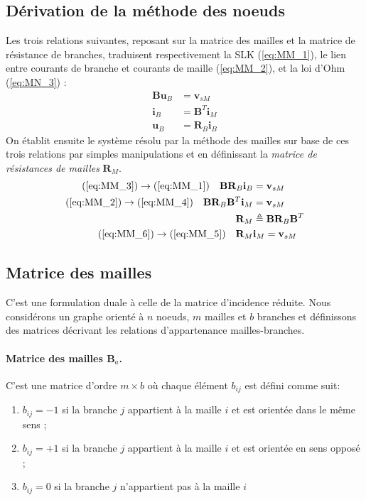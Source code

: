 \subsection{Dérivation de la méthode des noeuds}

Les trois relations suivantes, reposant sur la matrice des mailles et la matrice de résistance de branches, traduisent respectivement la SLK (\ref{eq:MM_1}), le lien entre courants de branche et courants de maille (\ref{eq:MM_2}), et la loi d'Ohm (\ref{eq:MN_3}) :
\begin{align}
\mathbf{B} \mathbf{u}_B &= \mathbf{v}_{sM} \label{eq:MM_1}\\
\mathbf{i}_B &= \mathbf{B}^T \mathbf{i}_{M} \label{eq:MM_2}\\
\mathbf{u}_B &= \mathbf{R}_B \mathbf{i}_{B} \label{eq:MM_3}
\end{align}
On établit ensuite le système résolu par la méthode des mailles sur base de ces trois relations par simples manipulations et en définissant la \textit{matrice de résistances de mailles} $\mathbf{R}_M.$
\begin{align}
(\ref{eq:MM_3}) \rightarrow (\ref{eq:MM_1}) \quad \mathbf{B} \mathbf{R}_B \mathbf{i}_{B} &= \mathbf{v}_{sM} \label{eq:MM_4}\\
(\ref{eq:MM_2}) \rightarrow (\ref{eq:MM_4}) \quad \mathbf{B} \mathbf{R}_B \mathbf{B}^T \mathbf{i}_{M} &= \mathbf{v}_{sM} \label{eq:MM_5}\\
\mathbf{R}_M &\triangleq \mathbf{B} \mathbf{R}_B \mathbf{B}^T \label{eq:MM_6}\\
(\ref{eq:MM_6}) \rightarrow (\ref{eq:MM_5}) \quad \mathbf{R}_M &\mathbf{i}_M = \mathbf{v}_{sM}
\end{align}

\subsection{Matrice des mailles}
C'est une formulation duale à celle de la matrice d'incidence réduite.
Nous considérons un graphe orienté à $n$ noeuds, $m$ mailles et $b$ branches et définissons des matrices décrivant les relations d'appartenance mailles-branches.

\paragraph{Matrice des mailles $\mathbf{B}_a$.} C'est une matrice d'ordre $m \times b$ où chaque élément $b_{ij}$ est défini comme suit:
\begin{enumerate}
	\item $b_{ij} = -1$ si la branche $j$ appartient à la maille $i$ et est orientée dans le même sens ;
	\item $b_{ij} = +1$ si la branche $j$ appartient à la maille $i$ et est orientée en sens opposé ;
	\item $b_{ij} = 0$ si la branche $j$ n'appartient pas à la maille $i$
\end{enumerate}

